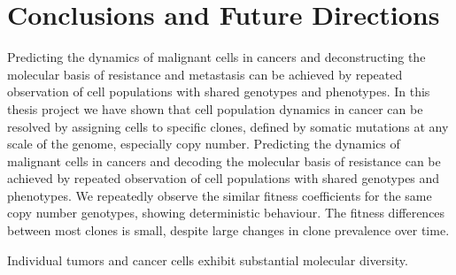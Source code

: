 
{\chapter{Conclusions and Future Directions}

}
\label{ch:Chapter6}
Predicting the dynamics of malignant cells in cancers and deconstructing the molecular basis of resistance and metastasis can be achieved by repeated observation of cell populations with shared genotypes and phenotypes. In this thesis project we have shown that cell population dynamics in cancer can be resolved by assigning cells to specific clones, defined by somatic mutations at any scale of the genome, especially copy number. Predicting the dynamics of malignant cells in cancers and decoding the molecular basis of resistance can be achieved by repeated observation of cell populations with shared genotypes and phenotypes.
We repeatedly observe the similar fitness coefficients for the same copy number genotypes, showing deterministic behaviour. The fitness differences between most clones is small, despite large changes in clone prevalence over time.






Individual tumors and cancer cells exhibit substantial molecular diversity.
